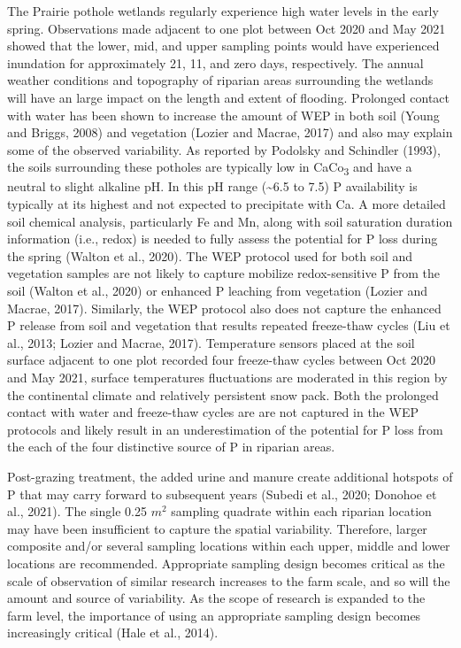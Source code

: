 \documentclass[
]{agujournal2019}
\begin{document}
The Prairie pothole wetlands regularly experience high water levels in
the early spring. Observations made adjacent to one plot between Oct
2020 and May 2021 showed that the lower, mid, and upper sampling points
would have experienced inundation for approximately 21, 11, and zero
days, respectively. The annual weather conditions and topography of
riparian areas surrounding the wetlands will have an large impact on the
length and extent of flooding. Prolonged contact with water has been
shown to increase the amount of WEP in both soil (Young and Briggs,
2008) and vegetation (Lozier and Macrae, 2017) and also may explain some
of the observed variability. As reported by Podolsky and Schindler
(1993), the soils surrounding these potholes are typically low in
CaCo\textsubscript{3} and have a neutral to slight alkaline pH. In this
pH range (\textasciitilde6.5 to 7.5) P availability is typically at its
highest and not expected to precipitate with Ca. A more detailed soil
chemical analysis, particularly Fe and Mn, along with soil saturation
duration information (i.e., redox) is needed to fully assess the
potential for P loss during the spring (Walton et al., 2020). The WEP
protocol used for both soil and vegetation samples are not likely to
capture mobilize redox-sensitive P from the soil (Walton et al., 2020)
or enhanced P leaching from vegetation (Lozier and Macrae, 2017).
Similarly, the WEP protocol also does not capture the enhanced P release
from soil and vegetation that results repeated freeze-thaw cycles (Liu
et al., 2013; Lozier and Macrae, 2017). Temperature sensors placed at
the soil surface adjacent to one plot recorded four freeze-thaw cycles
between Oct 2020 and May 2021, surface temperatures fluctuations are
moderated in this region by the continental climate and relatively
persistent snow pack. Both the prolonged contact with water and
freeze-thaw cycles are are not captured in the WEP protocols and likely
result in an underestimation of the potential for P loss from the each
of the four distinctive source of P in riparian areas.

Post-grazing treatment, the added urine and manure create additional
hotspots of P that may carry forward to subsequent years (Subedi et al.,
2020; Donohoe et al., 2021). The single 0.25 \(m^2\) sampling quadrate
within each riparian location may have been insufficient to capture the
spatial variability. Therefore, larger composite and/or several sampling
locations within each upper, middle and lower locations are recommended.
Appropriate sampling design becomes critical as the scale of observation
of similar research increases to the farm scale, and so will the amount
and source of variability. As the scope of research is expanded to the
farm level, the importance of using an appropriate sampling design
becomes increasingly critical (Hale et al., 2014).
\end{document}
